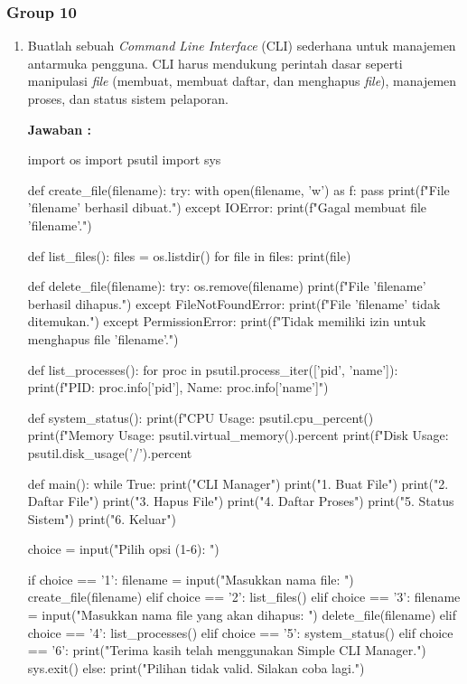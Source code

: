 \documentclass[12pt]{article}
\begin{document}
\subsubsection{Group 10}
\begin{enumerate}
    \item Buatlah sebuah \textit{Command Line Interface} (CLI) sederhana untuk manajemen antarmuka pengguna. CLI harus mendukung perintah dasar seperti manipulasi \textit{file} (membuat, membuat daftar, dan menghapus \textit{file}), manajemen proses, dan status sistem pelaporan.

    \textbf{Jawaban :}
    \begin{python}
        import os
import psutil
import sys

def create_file(filename):
    try:
        with open(filename, 'w') as f:
            pass
        print(f"File '{filename}' berhasil dibuat.")
    except IOError:
        print(f"Gagal membuat file '{filename}'.")

def list_files():
    files = os.listdir()
    for file in files:
        print(file)

def delete_file(filename):
    try:
        os.remove(filename)
        print(f"File '{filename}' berhasil dihapus.")
    except FileNotFoundError:
        print(f"File '{filename}' tidak ditemukan.")
    except PermissionError:
        print(f"Tidak memiliki izin untuk menghapus file '{filename}'.")

def list_processes():
    for proc in psutil.process_iter(['pid', 'name']):
        print(f"PID: {proc.info['pid']}, Name: {proc.info['name']}")

def system_status():
    print(f"CPU Usage: {psutil.cpu_percent()}%
    print(f"Memory Usage: {psutil.virtual_memory().percent}%
    print(f"Disk Usage: {psutil.disk_usage('/').percent}%

def main():
    while True:
        print("\nSimple CLI Manager")
        print("1. Buat File")
        print("2. Daftar File")
        print("3. Hapus File")
        print("4. Daftar Proses")
        print("5. Status Sistem")
        print("6. Keluar")
        
        choice = input("Pilih opsi (1-6): ")
        
        if choice == '1':
            filename = input("Masukkan nama file: ")
            create_file(filename)
        elif choice == '2':
            list_files()
        elif choice == '3':
            filename = input("Masukkan nama file yang akan dihapus: ")
            delete_file(filename)
        elif choice == '4':
            list_processes()
        elif choice == '5':
            system_status()
        elif choice == '6':
            print("Terima kasih telah menggunakan Simple CLI Manager.")
            sys.exit()
        else:
            print("Pilihan tidak valid. Silakan coba lagi.")


\end{python}
\end{enumerate}
\end{document}
